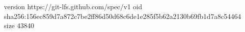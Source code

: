 version https://git-lfs.github.com/spec/v1
oid sha256:156ec859d7a872c7be2ff86d50d68c6de1e285f5b62a2130b69fb1d7a8c54464
size 43840
